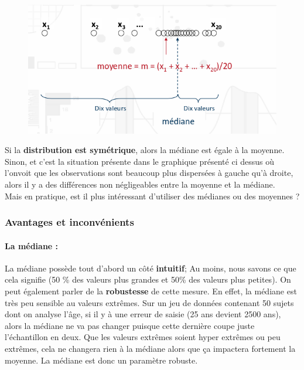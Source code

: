 \begin{figure}[H]\begin{center}\includegraphics[scale=0.5]{ilu/g5.png}\end{center}\end{figure}
Si la \textbf{distribution est symétrique}, alors la médiane est égale à la moyenne. Sinon, et c'est la situation présente dans le graphique présenté ci dessus où l'onvoit que les observations sont beaucoup plus dispersées à gauche qu'à droite, alors il y a des différences non négligeables entre la moyenne et la médiane.\newline
\\
Mais en pratique, est il plus intéressant d'utiliser des médianes ou des moyennes ?\newline
\subsubsection{Avantages et inconvénients}

\paragraph{La médiane :} La médiane possède tout d'abord un côté \textbf{intuitif}; Au moins, nous savons ce que cela signifie (50 \% des valeurs plus grandes et 50\% des valeurs plus petites). \newline
On peut également parler de la \textbf{robustesse} de cette mesure. En effet, la médiane est très peu sensible au valeurs extrêmes. Sur un jeu de données contenant 50 sujets dont on analyse l'âge, si il y à une erreur de saisie (25 ans devient 2500 ans), alors la médiane ne va pas changer puisque cette dernière coupe juste l'échantillon en deux. Que les valeurs extrêmes soient hyper extrêmes ou peu extrêmes, cela ne changera rien à la médiane alors que ça impactera fortement la moyenne. \newline
La médiane est donc un paramètre robuste.
